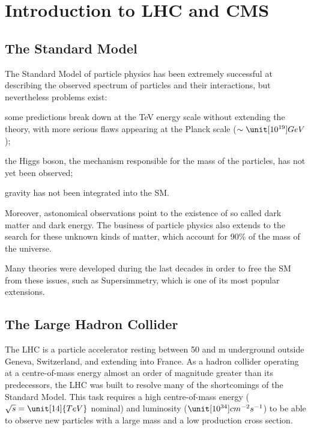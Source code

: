 \chapter{Introduction to LHC and CMS}\label{chap:intro}
\resetPageNumbering 

\section{The Standard Model}
The Standard Model of particle physics has been extremely successful at describing the observed spectrum of particles and their interactions, but nevertheless problems exist:
    \begin{packed_item}
        \item some predictions break down at the TeV energy scale without extending the theory, with more serious flaws appearing at the Planck scale ($\sim \unit[10^{19}]{GeV}$);
        \item the Higgs boson, the mechanism responsible for the mass of the particles, has not yet been observed;
        \item gravity has not been integrated into the SM.
    \end{packed_item}
Moreover, astonomical observations point to the existence of so called dark matter and dark energy. The business of particle physics also extends to the search for these unknown kinds of matter, which account for 90\% of the mass of the universe.

Many theories were developed during the last decades in order to free the SM from these issues, such as Supersimmetry, which is one of its most popular extensions. 

\section{The Large Hadron Collider}
The LHC is a particle accelerator resting between 50 and \unit[100]{m} underground outside Geneva, Switzerland, and extending into France. As a hadron collider operating at a centre-of-mass energy almost an order of magnitude greater than its predecessors, the LHC was built to resolve many of the shortcomings of the Standard Model. 
This task requires a high centre-of-mass energy ($\sqrt{s} = \unit[14]{TeV}$ nominal) and luminosity ($\unit[10^{34}]{cm^{-2}s^{-1}}$) to be able to observe new particles with a large mass and a low production cross section.

